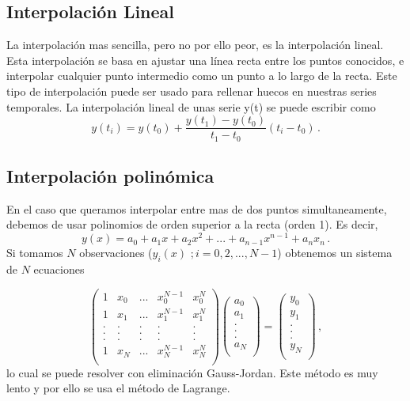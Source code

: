 \documentclass[
]{agujournal2019}
\begin{document}
\hypertarget{interpolaciuxf3n-lineal}{%
\subsection{Interpolación Lineal}\label{interpolaciuxf3n-lineal}}

La interpolación mas sencilla, pero no por ello peor, es la
interpolación lineal. Esta interpolación se basa en ajustar una línea
recta entre los puntos conocidos, e interpolar cualquier punto
intermedio como un punto a lo largo de la recta. Este tipo de
interpolación puede ser usado para rellenar huecos en nuestras series
temporales. La interpolación lineal de unas serie y(t) se puede escribir
como \[y(t_i)=y(t_0)+\frac{y(t_1)-y(t_0)}{t_1 - t_0}(t_i-t_0)\,.\]

\hypertarget{interpolaciuxf3n-polinuxf3mica}{%
\subsection{Interpolación
polinómica}\label{interpolaciuxf3n-polinuxf3mica}}

En el caso que queramos interpolar entre mas de dos puntos
simultaneamente, debemos de usar polinomios de orden superior a la recta
(orden 1). Es decir,
\[y(x)=a_0 + a_1 x + a_2 x^2 + ... + a_{n-1}x^{n-1} + a_n x_n\,.\] Si
tomamos \(N\) observaciones (\(y_i(x)\,\,;i=0,2,...,N-1\)) obtenemos un
sistema de \(N\) ecuaciones

\[\left(\begin{array}{ccccc}
  1 & x_0 & ... & x_0^{N-1} & x_0^N\\
  1 & x_1 & ... & x_1^{N-1} & x_1^N\\
  . & . & . & . & .\\
  . & . & . & . & .\\
  . & . & . & . & .\\
  1 & x_N & ... & x_N^{N-1} & x_N^N\\
     \end{array}\right)
    \left(\begin{array}{c}
  a_0 \\
  a_1 \\
  . \\
  . \\
  . \\
  a_N \\
     \end{array}\right)=
     \left(\begin{array}{c}
  y_0 \\
  y_1 \\
  . \\
  . \\
  . \\
  y_N \\
     \end{array}\right)\,,\] lo cual se puede resolver con eliminación
Gauss-Jordan. Este método es muy lento y por ello se usa el método de
Lagrange.
\end{document}
